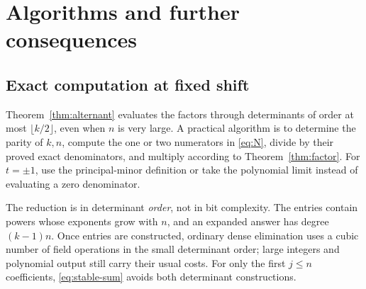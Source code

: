 \documentclass[11pt]{article}
\theoremstyle{definition}
\theoremstyle{remark}
\theoremstyle{definition}
\theoremstyle{plain}
\numberwithin{equation}{section}
\begin{document}
\section{Algorithms and further consequences}
\label{sec:consequences}

\subsection{Exact computation at fixed shift}
Theorem~\ref{thm:alternant} evaluates the factors through determinants of
order at most $\lfloor k/2\rfloor$, even when $n$ is very large.
A practical algorithm is to determine the parity of $k,n$, compute the
one or two numerators in \eqref{eq:N}, divide by their proved exact
denominators, and multiply according to Theorem~\ref{thm:factor}.
For $t=\pm1$, use the principal-minor definition or take the polynomial
limit instead of evaluating a zero denominator.

The reduction is in determinant \emph{order}, not in bit complexity.
The entries contain powers whose exponents grow with $n$, and an expanded
answer has degree $(k-1)n$. Once entries are constructed, ordinary dense
elimination uses a cubic number of field operations in the small determinant
order; large integers and polynomial output still carry their usual costs.
For only the first $j\le n$ coefficients, \eqref{eq:stable-sum} avoids
both determinant constructions.
\end{document}
